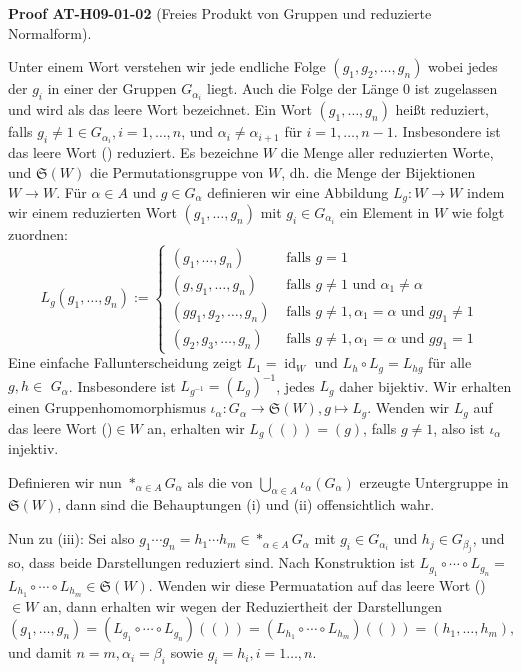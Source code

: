 \documentclass[10pt, letterpaper]{article}
\newcommand{\CustomHeading}[3]{%
  \par\medskip\noindent%
  \textbf{#1 #2} \textnormal{(#3)}.\enskip%
}
\newenvironment{PROOF}[2]{\begin{unitbox}\CustomHeading{Proof}{#1}{#2}}{\end{unitbox}}
\begin{document}
\begin{PROOF}{AT-H09-01-02}{Freies Produkt von Gruppen und reduzierte Normalform}
Unter einem Wort verstehen wir jede endliche Folge $\left(g_1, g_2, \ldots, g_n\right)$ wobei jedes der $g_i$ in einer der Gruppen $G_{\alpha_i}$ liegt. Auch die Folge der Länge 0 ist zugelassen und wird als das leere Wort bezeichnet. Ein Wort $\left(g_1, \ldots, g_n\right)$ heißt reduziert, falls $g_i \neq 1 \in G_{\alpha_i}, i=1, \ldots, n$, und $\alpha_i \neq \alpha_{i+1}$ für $i=1, \ldots, n-1$. Insbesondere ist das leere Wort () reduziert. Es bezeichne $W$ die Menge aller reduzierten Worte, und $\mathfrak{S}(W)$ die Permutationsgruppe von $W$, dh. die Menge der Bijektionen $W \rightarrow W$. Für $\alpha \in A$ und $g \in G_\alpha$ definieren wir eine Abbildung $L_g: W \rightarrow W$ indem wir einem reduzierten Wort $\left(g_1, \ldots, g_n\right)$ mit $g_i \in G_{\alpha_i}$ ein Element in $W$ wie folgt zuordnen:
$$
L_g\left(g_1, \ldots, g_n\right):= \begin{cases}\left(g_1, \ldots, g_n\right) & \text { falls } g=1 \\ \left(g, g_1, \ldots, g_n\right) & \text { falls } g \neq 1 \text { und } \alpha_1 \neq \alpha \\ \left(g g_1, g_2, \ldots, g_n\right) & \text { falls } g \neq 1, \alpha_1=\alpha \text { und } g g_1 \neq 1 \\ \left(g_2, g_3, \ldots, g_n\right) & \text { falls } g \neq 1, \alpha_1=\alpha \text { und } g g_1=1\end{cases}
$$
Eine einfache Fallunterscheidung zeigt $L_1=\operatorname{id}_W$ und $L_h \circ L_g=L_{h g}$ für alle $g, h \in$ $G_\alpha$. Insbesondere ist $L_{g^{-1}}=\left(L_g\right)^{-1}$, jedes $L_g$ daher bijektiv. Wir erhalten einen Gruppenhomomorphismus $\iota_\alpha: G_\alpha \rightarrow \mathfrak{S}(W), g \mapsto L_g$. Wenden wir $L_g$ auf das leere Wort ()$\in W$ an, erhalten wir $L_g(())=(g)$, falls $g \neq 1$, also ist $\iota_\alpha$ injektiv. 

Definieren wir nun $*_{\alpha \in A} G_\alpha$ als die von $\bigcup_{\alpha \in A} \iota_\alpha\left(G_\alpha\right)$ erzeugte Untergruppe in $\mathfrak{S}(W)$, dann sind die Behauptungen (i) und (ii) offensichtlich wahr. 

Nun zu (iii): Sei also $g_1 \cdots g_n=h_1 \cdots h_m \in *_{\alpha \in A} G_\alpha$ mit $g_i \in G_{\alpha_i}$ und $h_j \in G_{\beta_j}$, und so, dass beide Darstellungen reduziert sind. Nach Konstruktion ist $L_{g_1} \circ \cdots \circ L_{g_n}=$ $L_{h_1} \circ \cdots \circ L_{h_m} \in \mathfrak{S}(W)$. Wenden wir diese Permuatation auf das leere Wort () $\in W$ an, dann erhalten wir wegen der Reduziertheit der Darstellungen
$$
\left(g_1, \ldots, g_n\right)=\left(L_{g_1} \circ \cdots \circ L_{g_n}\right)(())=\left(L_{h_1} \circ \cdots \circ L_{h_m}\right)(())=\left(h_1, \ldots, h_m\right),
$$
und damit $n=m, \alpha_i=\beta_i$ sowie $g_i=h_i, i=1 \ldots, n$. 


\end{PROOF}
\end{document}
